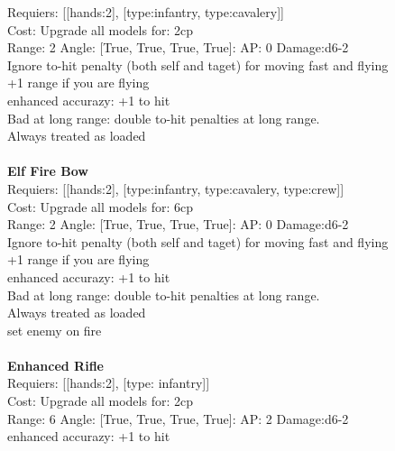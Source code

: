 Requiers: [[hands:2], [type:infantry, type:cavalery]] \\
Cost: Upgrade all models for: 2cp \\


Range: 2  Angle: [True, True, True, True]: AP: 0 Damage:d6-2 \\
Ignore to-hit penalty (both self and taget) for moving fast and flying\\ 
+1 range if you are flying\\ 
enhanced accurazy: +1 to hit\\ 
Bad at long range: double to-hit penalties at long range.\\ 
Always treated as loaded\\ 








\ \\
{\bf Elf Fire Bow } \\

Requiers: [[hands:2], [type:infantry, type:cavalery, type:crew]] \\
Cost: Upgrade all models for: 6cp \\


Range: 2  Angle: [True, True, True, True]: AP: 0 Damage:d6-2 \\
Ignore to-hit penalty (both self and taget) for moving fast and flying\\ 
+1 range if you are flying\\ 
enhanced accurazy: +1 to hit\\ 
Bad at long range: double to-hit penalties at long range.\\ 
Always treated as loaded\\ 
set enemy on fire\\ 








\ \\
{\bf Enhanced Rifle } \\

Requiers: [[hands:2], [type: infantry]] \\
Cost: Upgrade all models for: 2cp \\


Range: 6  Angle: [True, True, True, True]: AP: 2 Damage:d6-2 \\
enhanced accurazy: +1 to hit\\ 








